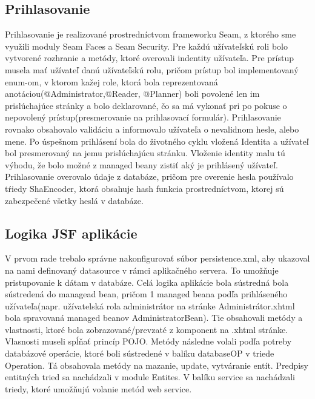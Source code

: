 \subsection{Prihlasovanie}
Prihlasovanie je realizované prostredníctvom frameworku Seam, z ktorého sme využili moduly Seam Faces a Seam Security. Pre každú užívateľskú roli bolo vytvorené rozhranie a metódy, ktoré overovali indentity užívateľa. Pre prístup musela mať užívateľ danú užívateľskú rolu, pričom prístup bol implementovaný enum-om, v ktorom kažej role, ktorá bola reprezentovaná anotáciou(@Administrator,@Reader, @Planner) boli povolené len im prislúchajúce stránky a bolo deklarované, čo sa má vykonať pri po pokuse o nepovolený prístup(presmerovanie na prihlasovací formulár). Prihlasovanie rovnako obsahovalo validáciu a informovalo užívateľa o nevalidnom hesle, alebo mene. Po úspešnom prihlásení bola do životného cyklu vložená Identita a užívateľ bol presmerovaný na jemu prislúchajúcu stránku. Vloženie identity malu tú výhodu, že bolo možné z managed beany zistiť aký je prihlásený užívateľ. Prihlasovanie overovalo údaje z databáze, pričom pre overenie hesla používalo tŕiedy ShaEncoder, ktorá obsahuje hash funkcia prostredníctvom, ktorej sú zabezpečené všetky heslá v databáze.

\subsection{Logika JSF aplikácie}
V prvom rade trebalo správne nakonfigurovať súbor persistence.xml, aby ukazoval na nami definovaný datasource v rámci aplikačného servera. To umožňuje pristupovanie k dátam v databáze.
Celá logika aplikácie bola sústredná bola sústredená do managead bean, pričom 1 managed beana podľa prihláseného užívateľa(napr. užívatelská rola administrátor na stránke Administrátor.xhtml bola spravovaná managed beanov AdministratorBean). Tie obsahovali metódy a vlastnosti, ktoré bola zobrazované/prevzaté z komponent na .xhtml stránke. Vlasnosti museli spĺňať princíp POJO. Metódy následne volali podľa potreby databázové operácie, ktoré boli sústredené v balíku databaseOP v triede Operation. Tá obsahovala metódy na mazanie, update, vytváranie entít. Predpisy entitných tried sa nachádzali v module Entites. V balíku service sa nachádzali triedy, ktoré umožňujú volanie metód web service.

